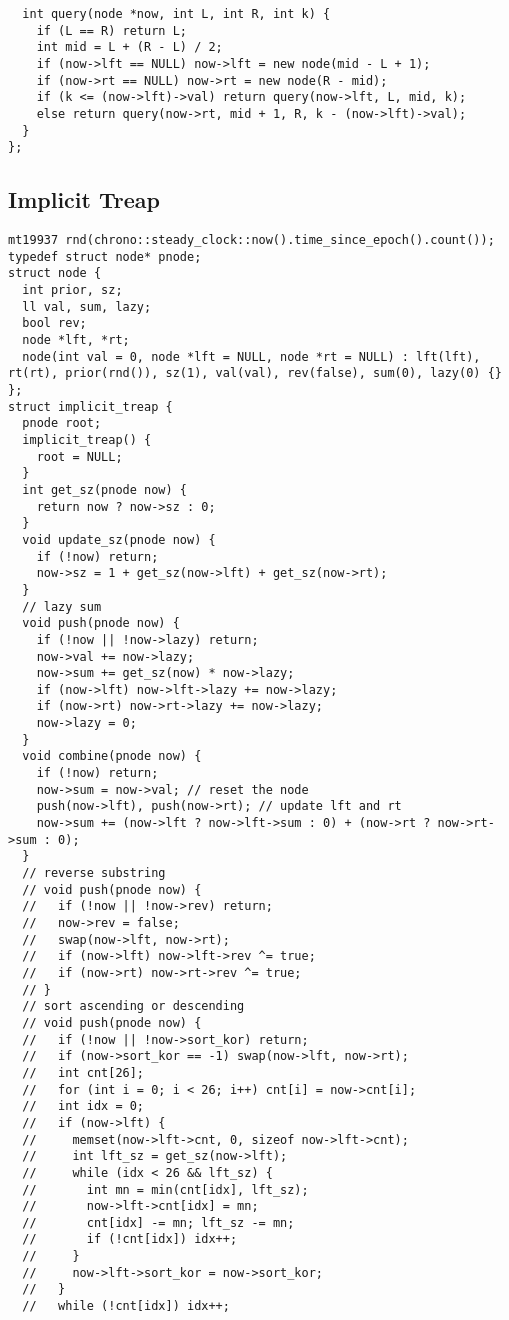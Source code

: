 \documentclass[10pt,a4paper,onesided]{article}
\begin{document}
\begin{multicols*}{3}
\begin{lstlisting}
  int query(node *now, int L, int R, int k) {
    if (L == R) return L;
    int mid = L + (R - L) / 2;
    if (now->lft == NULL) now->lft = new node(mid - L + 1);
    if (now->rt == NULL) now->rt = new node(R - mid);
    if (k <= (now->lft)->val) return query(now->lft, L, mid, k);
    else return query(now->rt, mid + 1, R, k - (now->lft)->val);
  }
};
\end{lstlisting}
\subsection{Implicit Treap}
\begin{lstlisting}
mt19937 rnd(chrono::steady_clock::now().time_since_epoch().count());
typedef struct node* pnode;
struct node {
  int prior, sz;
  ll val, sum, lazy;
  bool rev;
  node *lft, *rt;
  node(int val = 0, node *lft = NULL, node *rt = NULL) : lft(lft), rt(rt), prior(rnd()), sz(1), val(val), rev(false), sum(0), lazy(0) {}
};
struct implicit_treap {
  pnode root;
  implicit_treap() {
    root = NULL;
  }
  int get_sz(pnode now) {
    return now ? now->sz : 0;
  }
  void update_sz(pnode now) {
    if (!now) return;
    now->sz = 1 + get_sz(now->lft) + get_sz(now->rt);
  }
  // lazy sum
  void push(pnode now) {
    if (!now || !now->lazy) return;
    now->val += now->lazy;
    now->sum += get_sz(now) * now->lazy;
    if (now->lft) now->lft->lazy += now->lazy;
    if (now->rt) now->rt->lazy += now->lazy;
    now->lazy = 0;
  }
  void combine(pnode now) {
    if (!now) return;
    now->sum = now->val; // reset the node
    push(now->lft), push(now->rt); // update lft and rt
    now->sum += (now->lft ? now->lft->sum : 0) + (now->rt ? now->rt->sum : 0);
  }
  // reverse substring
  // void push(pnode now) {
  //   if (!now || !now->rev) return;
  //   now->rev = false;
  //   swap(now->lft, now->rt);
  //   if (now->lft) now->lft->rev ^= true;
  //   if (now->rt) now->rt->rev ^= true;
  // }
  // sort ascending or descending
  // void push(pnode now) {
  //   if (!now || !now->sort_kor) return;
  //   if (now->sort_kor == -1) swap(now->lft, now->rt);
  //   int cnt[26];
  //   for (int i = 0; i < 26; i++) cnt[i] = now->cnt[i];
  //   int idx = 0;
  //   if (now->lft) {
  //     memset(now->lft->cnt, 0, sizeof now->lft->cnt);
  //     int lft_sz = get_sz(now->lft);
  //     while (idx < 26 && lft_sz) {
  //       int mn = min(cnt[idx], lft_sz);
  //       now->lft->cnt[idx] = mn;
  //       cnt[idx] -= mn; lft_sz -= mn;
  //       if (!cnt[idx]) idx++;
  //     }
  //     now->lft->sort_kor = now->sort_kor;
  //   }
  //   while (!cnt[idx]) idx++;

\end{lstlisting}
\end{multicols*}
\end{document}
